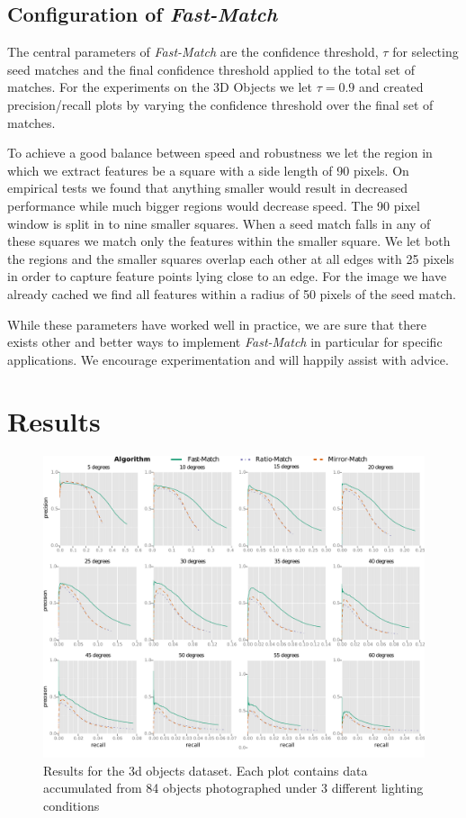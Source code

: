 \documentclass[runningheads]{llncs}
\begin{document}
\subsection{Configuration of \emph{Fast-Match}}
The central parameters of \emph{Fast-Match} are the confidence threshold, $\tau$ for selecting seed matches and the final confidence threshold applied to the total set of matches. For the experiments on the 3D Objects we let $\tau = 0.9$ and created precision/recall plots by varying the confidence threshold over the final set of matches. 

To achieve a good balance between speed and robustness we let the region in which we extract features be a square with a side length of 90 pixels. On empirical tests we found that anything smaller would result in decreased performance while much bigger regions would decrease speed. The 90 pixel window is split in to nine smaller squares. When a seed match falls in any of these squares we match only the features within the smaller square. We let both the regions and the smaller squares overlap each other at all edges with 25 pixels in order to capture feature points lying close to an edge. For the image we have already cached we find all features within a radius of 50 pixels of the seed match.

While these parameters have worked well in practice, we are sure that there exists other and better ways to implement \emph{Fast-Match} in particular for specific applications. We encourage experimentation and will happily assist with advice.

\section{Results}
\label{results}

\begin{figure}[t]
\centering
\includegraphics[width=1\columnwidth]{images/grid_match_all}
\caption{Results for the 3d objects dataset. Each plot contains data accumulated from 84 objects photographed under 3 different lighting conditions}
\label{fig:all_objects}
\end{figure}
\end{document}
